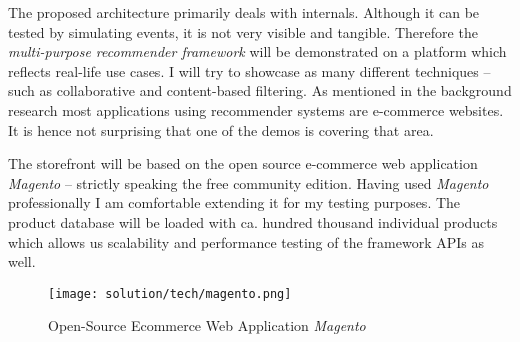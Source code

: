 The proposed architecture primarily deals with internals. Although it can be tested by simulating events, it is not very visible and tangible. Therefore the \emph{multi-purpose recommender framework} will be demonstrated on a platform which reflects real-life use cases. I will try to showcase as many different techniques -- such as collaborative and content-based filtering. As mentioned in the background research most applications using recommender systems are e-commerce websites. It is hence not surprising that one of the demos is covering that area.

The storefront will be based on the open source e-commerce web application \emph{Magento} -- strictly speaking the free community edition. Having used \emph{Magento} professionally I am comfortable extending it for my testing purposes. The product database will be loaded with ca. hundred thousand individual products which allows us scalability and performance testing of the framework APIs as well.

\begin{figure}[ht]
    \texttt{[image: solution/tech/magento.png]}
    \caption{Open-Source Ecommerce Web Application \emph{Magento}}
    \label{fig:magento}
\end{figure}